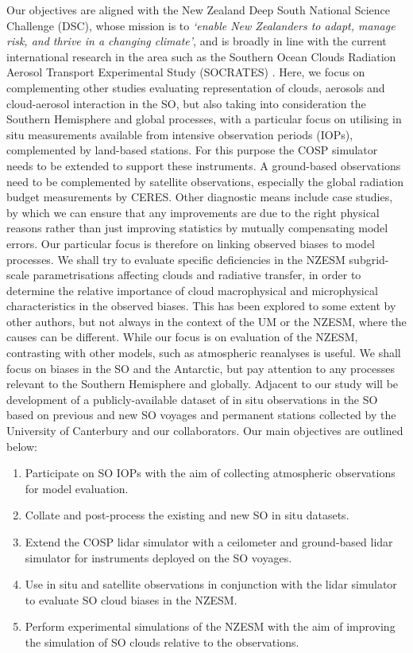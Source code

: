 Our objectives are aligned with the New Zealand Deep South National
Science Challenge (DSC), whose mission is to \textit{`enable New Zealanders to adapt,
manage risk, and thrive in a changing climate'}, and is
broadly in line with the current international research in the area
such as the Southern Ocean Clouds
Radiation Aerosol Transport Experimental Study (SOCRATES) \citep{mcfarquhar2014}.
Here, we focus on complementing other studies evaluating
representation of clouds, aerosols and cloud-aerosol interaction in the SO,
but also taking into consideration the Southern Hemisphere and global processes,
with a particular focus on utilising in situ measurements
available from intensive observation periods (IOPs), complemented by land-based
stations. For this
purpose the COSP simulator needs to be extended to support these
instruments. A ground-based observations need to be
complemented by satellite observations, especially the global radiation budget
measurements by CERES.
Other diagnostic means include
case studies, by which we can ensure that any improvements are due to
the right physical reasons rather than just improving statistics by mutually
compensating model errors. Our particular focus is therefore on linking
observed biases to model processes. 
We shall try to evaluate specific deficiencies in the NZESM subgrid-scale
parametrisations affecting clouds and radiative transfer, in order to
determine the relative importance of cloud macrophysical and microphysical
characteristics in the observed biases. This has been explored to some extent
by other authors, but not always in the context of the UM or the NZESM,
where the causes can be different.
While our focus is on evaluation of the NZESM, contrasting with other
models, such as atmospheric reanalyses is useful.
We shall focus on biases in the SO and the
Antarctic, but pay attention to any processes relevant to the Southern
Hemisphere and globally.
Adjacent to our study will be development of a publicly-available dataset
of in situ observations in the SO based on previous and new SO voyages
and permanent stations collected by the University of Canterbury and our
collaborators.
Our main objectives are outlined below:

\begin{enumerate}
\item Participate on SO IOPs
with the aim of collecting atmospheric observations for model evaluation.
\item Collate and post-process the existing and new SO in situ datasets.
\item Extend the COSP lidar simulator with a ceilometer and ground-based lidar
simulator for instruments deployed on the SO voyages.
\item Use in situ and satellite observations in conjunction with the lidar simulator
to evaluate SO cloud biases in the NZESM.
\item Perform experimental simulations of the NZESM with the aim of
improving the simulation of SO clouds relative to the observations.
\end{enumerate}

